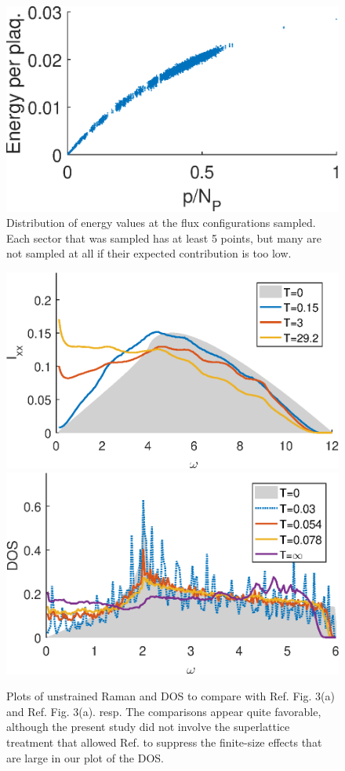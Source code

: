 \documentclass[reprint,amsmath,amssymb,aps,prl,groupedaddress,nofootinbib,superscriptaddress]{revtex4-1}
\newcommand{\1}{\mathds{1}}
\begin{document}



\begin{figure}
	\centering
	\includegraphics[width=0.4\linewidth]{stretch_En_rmax_15_b_10_s_40.eps} 
	\caption{Distribution of energy values at the flux configurations sampled. Each sector that was sampled has at least 5 points, but many are not sampled at all if their expected contribution is too low.} 
	\label{EndistPlot}
\end{figure}

\begin{figure}
	\centering
	\includegraphics[width=0.43\linewidth]{stretch_Ixx_special_b_rmax_11_b_10_s_0.eps} 
	\includegraphics[width=0.43\linewidth]{stretch_DOS_special_b_rmax_7_b_10_s_0.eps} 
	\caption{Plots of unstrained Raman and DOS to compare with Ref. \cite{Nasu16} Fig. 3(a) and Ref. \cite{Nasu15} Fig. 3(a). resp. The comparisons appear quite favorable, although the present study did not involve the superlattice treatment that allowed Ref. \cite{Nasu15} to suppress the finite-size effects that are large in our plot of the DOS. }
	\label{comparePlots}
\end{figure}


	
\end{document}
